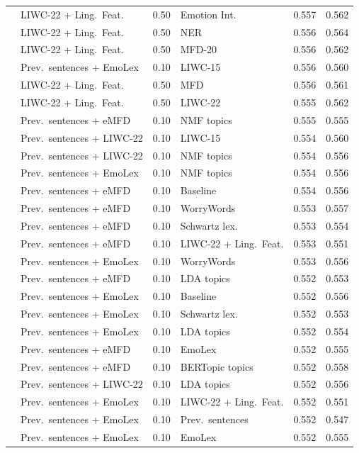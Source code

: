 {\begin{longtable}{llclcc}
 & LIWC-22 + Ling.\ Feat. & 0.50 & Emotion Int. & 0.557 & 0.562 \\
 & LIWC-22 + Ling.\ Feat. & 0.50 & NER & 0.556 & 0.564 \\
 & LIWC-22 + Ling.\ Feat. & 0.50 & MFD-20 & 0.556 & 0.562 \\
 & Prev.\ sentences + EmoLex & 0.10 & LIWC-15 & 0.556 & 0.560 \\
 & LIWC-22 + Ling.\ Feat. & 0.50 & MFD & 0.556 & 0.561 \\
 & LIWC-22 + Ling.\ Feat. & 0.50 & LIWC-22 & 0.555 & 0.562 \\
 & Prev.\ sentences + eMFD & 0.10 & NMF topics & 0.555 & 0.555 \\
 & Prev.\ sentences + LIWC-22 & 0.10 & LIWC-15 & 0.554 & 0.560 \\
 & Prev.\ sentences + LIWC-22 & 0.10 & NMF topics & 0.554 & 0.556 \\
 & Prev.\ sentences + EmoLex & 0.10 & NMF topics & 0.554 & 0.556 \\
 & Prev.\ sentences + eMFD & 0.10 & Baseline & 0.554 & 0.556 \\
 & Prev.\ sentences + eMFD & 0.10 & WorryWords & 0.553 & 0.557 \\
 & Prev.\ sentences + eMFD & 0.10 & Schwartz lex. & 0.553 & 0.554 \\
 & Prev.\ sentences + eMFD & 0.10 & LIWC-22 + Ling.\ Feat. & 0.553 & 0.551 \\
 & Prev.\ sentences + EmoLex & 0.10 & WorryWords & 0.553 & 0.556 \\
 & Prev.\ sentences + eMFD & 0.10 & LDA topics & 0.552 & 0.553 \\
 & Prev.\ sentences + EmoLex & 0.10 & Baseline & 0.552 & 0.556 \\
 & Prev.\ sentences + EmoLex & 0.10 & Schwartz lex. & 0.552 & 0.553 \\
 & Prev.\ sentences + EmoLex & 0.10 & LDA topics & 0.552 & 0.554 \\
 & Prev.\ sentences + eMFD & 0.10 & EmoLex & 0.552 & 0.555 \\
 & Prev.\ sentences + eMFD & 0.10 & BERTopic topics & 0.552 & 0.558 \\
 & Prev.\ sentences + LIWC-22 & 0.10 & LDA topics & 0.552 & 0.556 \\
 & Prev.\ sentences + EmoLex & 0.10 & LIWC-22 + Ling.\ Feat. & 0.552 & 0.551 \\
 & Prev.\ sentences + EmoLex & 0.10 & Prev.\ sentences & 0.552 & 0.547 \\
 & Prev.\ sentences + EmoLex & 0.10 & EmoLex & 0.552 & 0.555 \\

\end{longtable}}
